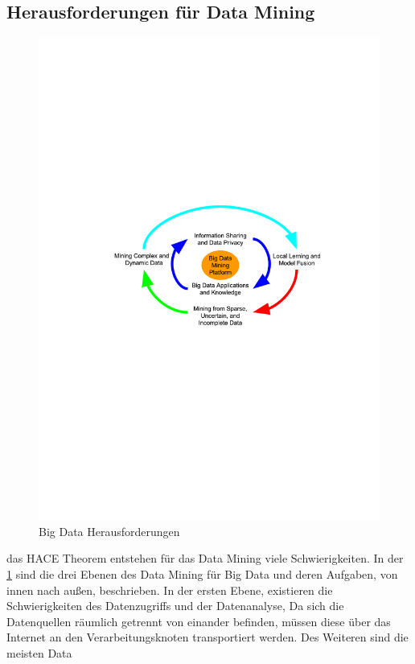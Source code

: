 \documentclass[12pt,journal,compsoc,ngerman]{IEEEtran}
\begin{document}
\subsection{Herausforderungen für Data Mining}
\begin{figure}[!t]
\centering
\label{fig:bigdata}
\includegraphics[scale=0.65,trim={120 340 100 280},clip]{../beamer/img/bigdata42.pdf}
\caption{Big Data Herausforderungen \cite{wu2014data}}
\end{figure}
 das HACE Theorem entstehen für das Data Mining viele Schwierigkeiten. In der \cref{fig:bigdata} 
sind die drei Ebenen des Data Mining für Big Data und deren Aufgaben, von innen nach außen, beschrieben. In der ersten Ebene, 
existieren die Schwierigkeiten des Datenzugriffs und der Datenanalyse, Da sich die Datenquellen räumlich getrennt von einander 
befinden, müssen diese über das Internet an den Verarbeitungsknoten transportiert werden. Des Weiteren sind  die meisten Data 
\end{document}
